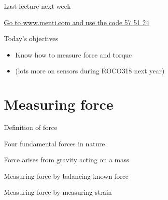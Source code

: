 \documentclass[compress]{beamer}
\makeatletter
\let\beamer@writeslidentry@miniframeson=\beamer@writeslidentry
\newcommand*{\miniframeson}{\let\beamer@writeslidentry=\beamer@writeslidentry@miniframeson}
\makeatother
\begin{document}
\begin{frame}{Last lecture next week}
    \begin{center}
        \Large
    \href{https://www.mentimeter.com/s/7045be359ddab73d8288b021b2c01e11/cf7e04cfa66c}{Go
        to www.menti.com and use the code 57 51 24}
    \end{center}
\end{frame}


\begin{frame}{Today's objectives}

    \begin{itemize}
            \item Know how to measure force and torque
            \item (lots more on sensors during ROCO318 next year)
    \end{itemize}
\end{frame}

\miniframeson


\section{Measuring force}

{
\begin{frame}{Definition of force}

\pnote{
}
\end{frame}
}
{
\begin{frame}{Four fundamental forces in nature}

\pnote{
}
\end{frame}
}

{
\begin{frame}{Force arises from gravity acting on a mass}

\pnote{
}
\end{frame}
}

{
\begin{frame}{Measuring force by balancing known force}

\pnote{
}
\end{frame}
}

{
\begin{frame}{Measuring force by measuring strain}

\pnote{
}
\end{frame}
}
\end{document}
